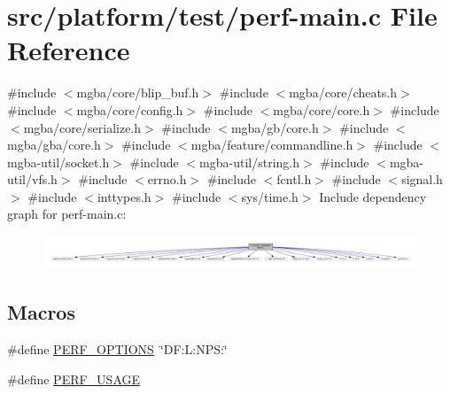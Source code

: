 \hypertarget{perf-main_8c}{}\section{src/platform/test/perf-\/main.c File Reference}
\label{perf-main_8c}
{\ttfamily \#include $<$mgba/core/blip\+\_\+buf.\+h$>$}\newline
{\ttfamily \#include $<$mgba/core/cheats.\+h$>$}\newline
{\ttfamily \#include $<$mgba/core/config.\+h$>$}\newline
{\ttfamily \#include $<$mgba/core/core.\+h$>$}\newline
{\ttfamily \#include $<$mgba/core/serialize.\+h$>$}\newline
{\ttfamily \#include $<$mgba/gb/core.\+h$>$}\newline
{\ttfamily \#include $<$mgba/gba/core.\+h$>$}\newline
{\ttfamily \#include $<$mgba/feature/commandline.\+h$>$}\newline
{\ttfamily \#include $<$mgba-\/util/socket.\+h$>$}\newline
{\ttfamily \#include $<$mgba-\/util/string.\+h$>$}\newline
{\ttfamily \#include $<$mgba-\/util/vfs.\+h$>$}\newline
{\ttfamily \#include $<$errno.\+h$>$}\newline
{\ttfamily \#include $<$fcntl.\+h$>$}\newline
{\ttfamily \#include $<$signal.\+h$>$}\newline
{\ttfamily \#include $<$inttypes.\+h$>$}\newline
{\ttfamily \#include $<$sys/time.\+h$>$}\newline
Include dependency graph for perf-\/main.c\+:
\nopagebreak
\begin{figure}[H]
\begin{center}
\leavevmode
\includegraphics[width=350pt]{perf-main_8c__incl}
\end{center}
\end{figure}
\subsection*{Macros}
\begin{DoxyCompactItemize}
\item 
\#define \mbox{\hyperlink{perf-main_8c_a10b7b15dd56a2e448bb115bca3c138ea}{P\+E\+R\+F\+\_\+\+O\+P\+T\+I\+O\+NS}}~\char`\"{}D\+F\+:\+L\+:\+N\+P\+S\+:\char`\"{}
\item 
\#define \mbox{\hyperlink{perf-main_8c_a397e50d8fab523d6a3f5ed6adeff6d40}{P\+E\+R\+F\+\_\+\+U\+S\+A\+GE}}
\end{DoxyCompactItemize}
